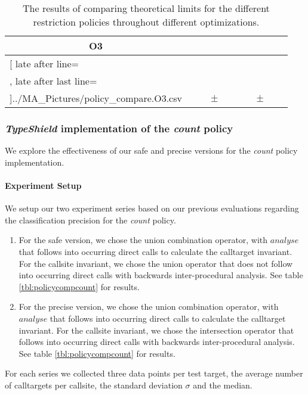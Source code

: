 \begin{table}[!htbp]
{\begin{tabular}{l|c|rcl|c|rcl|c}
\multicolumn{1}{c}{\bfseries O3}
	\\\midrule
	\csvreader[ late after line=\\, late after last line=\\\bottomrule]{../MA_Pictures/policy_compare.O3.csv}{
}
	{\csvcolii  &  \csvcoliii & \csvcolx & $\pm$ & \csvcolxi & \csvcolxii & \csvcolxix & $\pm$ & \csvcolxx& \csvcolxxi}%

    	\end{tabular}
}
		\caption {The results of comparing theoretical limits for the different restriction policies throughout different optimizations.}
		\label{tbl:policycomp}
\end{table}

\newpage
\subsubsection{\textit{TypeShield} implementation of the \textit{count} policy}
\label{subsection:typeshieldvslimitcount}
We explore the effectiveness of our safe and precise versions for the \textit{count} policy implementation.

\paragraph{Experiment Setup} We setup our two experiment series based on our previous evaluations regarding the classification precision for the \textit{count} policy.
\begin{enumerate}
\item For the safe version, we chose the union combination operator, with $analyse$ that follows into occurring direct calls to 
calculate the calltarget invariant. For the callsite invariant, we chose the union operator that does not follow into occurring direct calls with backwards inter-procedural analysis.  See table \ref{tbl:policycompcount} for results. 
\item For the precise version, we chose the union combination operator, with $analyse$ that follows into occurring direct calls to calculate the calltarget invariant. For the callsite invariant, we chose the intersection operator that follows into occurring direct calls with backwards inter-procedural analysis. See table \ref{tbl:policycompcount} for results. 
\end{enumerate}
For each series we collected three data points per test target, the average number of calltargets per callsite, the standard deviation $\sigma$ and the median.

